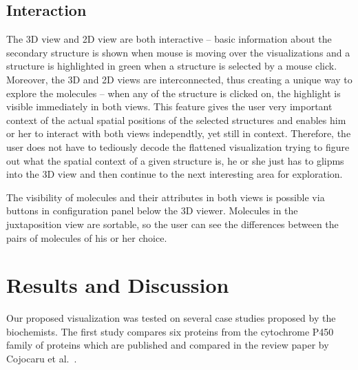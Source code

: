 \documentclass[twocolumn]{bmcart}%
\begin{document}
\subsection*{Interaction}



The 3D view and 2D view are both interactive -- basic information about the secondary structure is shown when mouse is moving over the visualizations and a structure is highlighted in green when a structure is selected by a mouse click. Moreover, the 3D and 2D views are interconnected, thus creating a unique way to explore the molecules -- when any of the structure is clicked on, the highlight is visible immediately in both views. This feature gives the user very important context of the actual spatial positions of the selected structures and enables him or her to interact with both views independtly, yet still in context. Therefore, the user does not have to tediously decode the flattened visualization trying to figure out what the spatial context of a given structure is, he or she just has to glipms into the 3D view and then continue to the next interesting area for exploration.

The visibility of molecules and their attributes in both views is possible via buttons in configuration panel below the 3D viewer. Molecules in the juxtaposition view are sortable, so the user can see the differences between the pairs of molecules of his or her choice.



\section*{Results and Discussion}
Our proposed visualization was tested on several case studies proposed by the biochemists.
The first study compares six proteins from the cytochrome P450 family of proteins which are published and compared in the review paper by Cojocaru et al.~\cite{Cojocaru2007}. 
\end{document}
